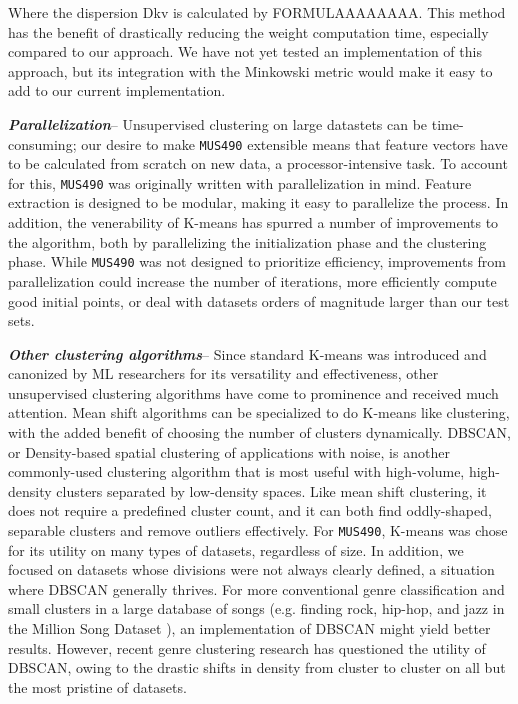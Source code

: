 \documentclass[10pt,twocolumn]{article}
\begin{document}
Where the dispersion Dkv is calculated by FORMULAAAAAAAA. This method has the benefit of drastically reducing the weight computation time, especially compared to our approach. We have not yet tested an implementation of this approach, but its integration with the Minkowski metric would make it easy to add to our current implementation.

\emph{\textbf{Parallelization}}-- Unsupervised clustering on large datastets can be time-consuming; our desire to make \texttt{MUS490} extensible means that feature vectors have to be calculated from scratch on new data, a processor-intensive task. To account for this, \texttt{MUS490} was originally written with parallelization in mind. Feature extraction is designed to be modular, making it easy to parallelize the process. In addition, the venerability of K-means has spurred a number of improvements to the algorithm, both by parallelizing the initialization phase \cite{KMeans++} and the clustering phase. \cite{ParallelK} While \texttt{MUS490} was not designed to prioritize efficiency, improvements from parallelization could increase the number of iterations, more efficiently compute good initial points, or deal with datasets orders of magnitude larger than our test sets.

\emph{\textbf{Other clustering algorithms}}-- Since standard K-means was introduced and canonized by ML researchers for its versatility and effectiveness, other unsupervised clustering algorithms have come to prominence and received much attention. Mean shift algorithms can be specialized to do K-means like clustering, with the added benefit of choosing the number of clusters dynamically. \cite{MeanShift} DBSCAN, or Density-based spatial clustering of applications with noise, is another commonly-used clustering algorithm that is most useful with high-volume, high-density clusters separated by low-density spaces. Like mean shift clustering, it does not require a predefined cluster count, and it can both find oddly-shaped, separable clusters and remove outliers effectively.
For \texttt{MUS490}, K-means was chose for its utility on many types of datasets, regardless of size. In addition, we focused on datasets whose divisions were not always clearly defined, a situation where DBSCAN generally thrives. For more conventional genre classification and small clusters in a large database of songs (e.g. finding rock, hip-hop, and jazz in the Million Song Dataset \cite{Bertin-Mahieux2011}), an implementation of DBSCAN might yield better results. However, recent genre clustering research has questioned the utility of DBSCAN, owing to the drastic shifts in density from cluster to cluster on all but the most pristine of datasets. \cite{DBSCAN}





\end{document}
